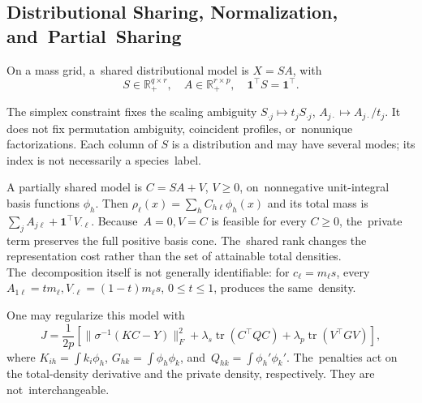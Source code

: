 \documentclass[mathematics,article,accept,moreauthors]{Definitions/mdpi}
\newcommand{\R}{\mathbb{R}}
\newcommand{\one}{\mathbf{1}}
\newcommand{\tr}{\operatorname{tr}}
\begin{document}
\subsection{Distributional Sharing, Normalization, and~Partial~Sharing}\label{sec:sharing}
On a mass grid, a~shared distributional model is $X=SA$, with 
~\begin{equation}\label{eq:mfconstraints}
 S\in\R_+^{q\times r},\quad A\in\R_+^{r\times p},\quad
 \one^\top S=\one^\top.
\end{equation}

The simplex constraint fixes the scaling ambiguity $S_{\cdot j}\mapsto t_jS_{\cdot j}$, $A_{j\cdot}\mapsto A_{j\cdot}/t_j$. It does not fix permutation ambiguity, coincident profiles, or~nonunique factorizations. Each column of $S$ is a distribution and may have several modes; its index is not necessarily a species~label.

A partially shared model is $C=SA+V$, $V\geq0$, on~nonnegative unit-integral basis functions $\phi_h$. Then $\rho_\ell(x)=\sum_h C_{h\ell}\phi_h(x)$ and its total mass is $\sum_j A_{j\ell}+\one^\top V_{\cdot\ell}$. Because~$A=0,V=C$ is feasible for every $C\geq0$, the~private term preserves the full positive basis cone. The~shared rank changes the representation cost rather than the set of attainable total densities. The~decomposition itself is not generally identifiable: for $c_\ell=m_\ell s$, every $A_{1\ell}=tm_\ell,V_{\cdot\ell}=(1-t)m_\ell s$, $0\leq t\leq1$, produces the same~density.

One may regularize this model with
\begin{equation}\label{eq:partial}
 J=\frac{1}{2p}\left[\|\sigma^{-1}(KC-Y)\|_F^2+
 \lambda_s\tr(C^\top QC)+\lambda_p\tr(V^\top GV)\right],
\end{equation}
where $K_{ih}=\int k_i\phi_h$, $G_{hk}=\int\phi_h\phi_k$, and~$Q_{hk}=\int\phi_h'\phi_k'$. The~penalties act on the total-density derivative and the private density, respectively. They are not~interchangeable.
\end{document}
